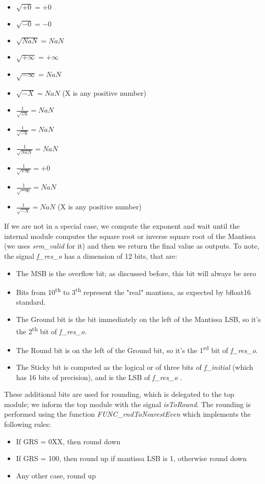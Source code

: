 \begin{itemize}
\item $\sqrt{+0} = +0$ 
\item $\sqrt{-0} = -0$
\item $\sqrt{NaN} = NaN$
\item $\sqrt{+ \infty}  =  +\infty$
\item $\sqrt{- \infty} =  NaN$
\item $\sqrt{- X} = NaN$  (X is any positive number) 
\item $\frac{1}{\sqrt{+0}} = NaN$
\item $\frac{1}{\sqrt{-0}} = NaN$
\item $\frac{1}{\sqrt{NaN}} = NaN$
\item $\frac{1}{\sqrt{+\infty}} = +0$
\item $\frac{1}{\sqrt{-\infty}} = NaN$
\item $\frac{1}{\sqrt{-X}} = NaN$  (X is any positive number) 
\end{itemize}

If we are not in a special case, we compute the exponent and wait until the internal module computes the square root or inverse square root of the Mantissa (we uses  \emph{srm\_valid} for it) and then we return the final value as outputs. To note, the signal \emph{f\_res\_o} has a dimension of 12 bits, that are:
\begin{itemize}
\item The MSB is the overflow bit; as discussed before, this bit will always be zero
\item Bits from 10\textsuperscript{th} to 3\textsuperscript{th} represent the "real" mantissa, as expected by bfloat16 standard.
\item The Ground bit is the bit immediately on the left of the Mantissa LSB, so it's the 2\textsuperscript{th} bit of \emph{f\_res\_o}.
\item The Round bit is on the left of the Ground bit, so it's the 1\textsuperscript{rd} bit of \emph{f\_res\_o}.
\item The Sticky bit is computed as the logical or of three bits of \emph{f\_initial} (which has 16 bits of precision), and is the LSB of \emph{f\_res\_o} . 
\end{itemize}
These additional bits are used for rounding, which is delegated to the top module; we inform the top module with the signal \emph{isToRound}. The rounding is performed using the function \emph{FUNC\_rndToNearestEven} which implements the following rules:
\begin{itemize}
\item If GRS = 0XX, then round down
\item If GRS = 100, then round up if mantissa LSB is 1, otherwise round down
\item Any other case, round up
\end{itemize} 

\clearpage
